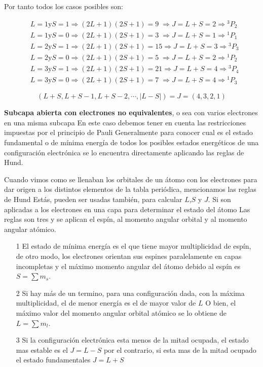 Por tanto todos los casos posibles son:

\begin{equation*}
\begin{aligned}
	&L=1 \text{y} S=1 \Rightarrow (2L+1)(2S+1)=9\;\Rightarrow J=L+S=2\Rightarrow {^{3}}P_{2}\\
	&L=1 \text{y} S=0 \Rightarrow (2L+1)(2S+1)=3\;\Rightarrow J=L+S=1\Rightarrow {^{1}}P_{1}\\			&L=2 \text{y} S=1 \Rightarrow (2L+1)(2S+1)=15\Rightarrow J=L+S=3\Rightarrow {^{3}}P_{3}\\
	&L=2 \text{y} S=0 \Rightarrow (2L+1)(2S+1)=5\;\Rightarrow J=L+S=2\Rightarrow {^{1}}P_{2}\\
	&L=3 \text{y} S=1 \Rightarrow (2L+1)(2S+1)=21\Rightarrow J=L+S=4\Rightarrow {^{3}}P_{4}\\
	&L=3 \text{y} S=0 \Rightarrow (2L+1)(2S+1)=7\;\Rightarrow J=L+S=4\Rightarrow {^{1}}P_{3}
\end{aligned}
\end{equation*}


\begin{equation*}
	(L+S, L+S-1, L+S-2, \cdots, |L-S|)= J = (4, 3, 2, 1)
\end{equation*}

\textbf{Subcapa abierta con electrones no equivalentes}, o sea con varios electrones en una misma subcapa En este caso debemos tener en cuenta las restricciones impuestas por el principio de Pauli Generalmente para conocer cual es el estado fundamental o de mínima energía de todos los posibles estados energéticos de una configuración electrónica se lo encuentra directamente aplicando las reglas de Hund.

Cuando vimos como se llenaban los orbitales de un átomo con los electrones para dar origen a los distintos elementos de la tabla periódica, mencionamos las reglas de Hund Estás, pueden ser usadas también, para calcular $L$,$S$ y $J$. Si son aplicadas a los electrones en una capa para determinar el estado del átomo Las reglas son tres y se aplican el espín, al momento angular orbital y al momento angular atómico.

\begin{itemize}
\item[1] El estado de mínima energía es el que tiene mayor multiplicidad de espín, de otro modo, los electrones orientan sus espines paralelamente en capas incompletas y el máximo momento angular del átomo debido al espín es $S=\sum m_{s}$.


\item[2] Si hay más de un termino, para una configuración dada, con la máxima multiplicidad, el de menor energía es el de mayor valor de $L$ O bien, el máximo valor del momento angular orbital atómico se lo obtiene de $L=\sum m_{l}$.


\item[3] Si la configuración electrónica esta menos de la mitad ocupada, el estado mas estable es el $J=L-S$ por el contrario, si esta mas de la mitad ocupado el estado fundamentales $J=L+S$
\end{itemize}

